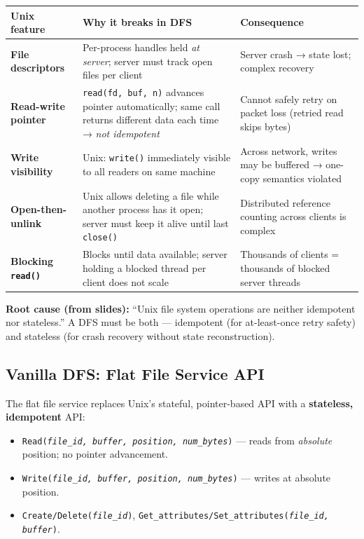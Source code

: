 \documentclass[12pt,a4paper]{article}
\begin{document}
\begin{center}
\begin{tabular}{@{}p{3.5cm}p{5.5cm}p{5.5cm}@{}}
\toprule
Unix feature & Why it breaks in DFS & Consequence \\
\midrule
\textbf{File descriptors} & Per-process handles held \emph{at server}; server must track open files per client & Server crash → state lost; complex recovery \\
\textbf{Read-write pointer} & \texttt{read(fd, buf, n)} advances pointer automatically; same call returns different data each time → \emph{not idempotent} & Cannot safely retry on packet loss (retried read skips bytes) \\
\textbf{Write visibility} & Unix: \texttt{write()} immediately visible to all readers on same machine & Across network, writes may be buffered → one-copy semantics violated \\
\textbf{Open-then-unlink} & Unix allows deleting a file while another process has it open; server must keep it alive until last \texttt{close()} & Distributed reference counting across clients is complex \\
\textbf{Blocking \texttt{read()}} & Blocks until data available; server holding a blocked thread per client does not scale & Thousands of clients = thousands of blocked server threads \\
\bottomrule
\end{tabular}
\end{center}

\textbf{Root cause (from slides):} ``Unix file system operations are neither idempotent nor stateless.'' A DFS must be both --- idempotent (for at-least-once retry safety) and stateless (for crash recovery without state reconstruction).

\subsection{Vanilla DFS: Flat File Service API}

The flat file service replaces Unix's stateful, pointer-based API with a \textbf{stateless, idempotent} API:

\begin{itemize}[noitemsep]
  \item \texttt{Read(\emph{file\_id, buffer, position, num\_bytes})} --- reads from \emph{absolute} position; no pointer advancement.
  \item \texttt{Write(\emph{file\_id, buffer, position, num\_bytes})} --- writes at absolute position.
  \item \texttt{Create/Delete(\emph{file\_id})}, \texttt{Get\_attributes/Set\_attributes(\emph{file\_id, buffer})}.
\end{itemize}
\end{document}
